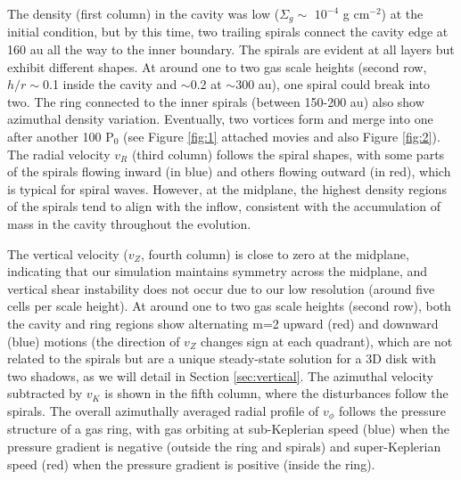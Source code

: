\documentclass[twocolumn,tighten]{aastex631}
\begin{document}
The density (first column) in the cavity was low ($\Sigma_g\sim$ $10^{-4}$ g cm$^{-2}$) at the initial condition, but by this time, two trailing spirals connect the cavity edge at 160 au all the way to the inner boundary. The spirals are evident at all layers but exhibit different shapes. At around one to two gas scale heights (second row, $h/r\sim$0.1 inside the cavity and $\sim$0.2 at $\sim$300 au), one spiral could break into two. The ring connected to the inner spirals (between 150-200 au) also show azimuthal density variation. Eventually, two vortices form and merge into one after another 100 P$_0$ (see Figure \ref{fig:1} attached movies and also Figure \ref{fig:2}). The radial velocity $v_R$ (third column) follows the spiral shapes, with some parts of the spirals flowing inward (in blue) and others flowing outward (in red), which is typical for spiral waves. However, at the midplane, the highest density regions of the spirals tend to align with the inflow, consistent with the accumulation of mass in the cavity throughout the evolution.

The vertical velocity ($v_Z$, fourth column) is close to zero at the midplane, indicating that our simulation maintains symmetry across the midplane, and vertical shear instability \citep{nelson13} does not occur due to our low resolution (around five cells per scale height). At around one to two gas scale heights (second row), both the cavity and ring regions show alternating m=2 upward (red) and downward (blue) motions (the direction of $v_Z$ changes sign at each quadrant), which are not related to the spirals but are a unique steady-state solution for a 3D disk with two shadows, as we will detail in Section \ref{sec:vertical}. The azimuthal velocity subtracted by $v_K$ is shown in the fifth column, where the disturbances follow the spirals. The overall azimuthally averaged radial profile of $v_\phi$ follows the pressure structure of a gas ring, with gas orbiting at sub-Keplerian speed (blue) when the pressure gradient is negative (outside the ring and spirals) and super-Keplerian speed (red) when the pressure gradient is positive (inside the ring).
\end{document}
